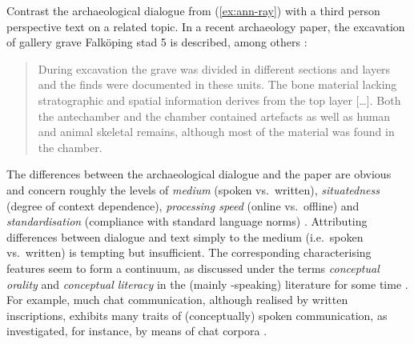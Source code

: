 \documentclass[output=paper
 	        ,biblatex
                ,babelshorthands
                ,newtxmath
                ,draftmode
                ,colorlinks, citecolor=brown
]{langscibook}
\begin{document}
\noindent
Contrast the archaeological dialogue from (\ref{ex:ann-ray}) with a third person perspective text on a related topic.
%
In a recent archaeology paper, the excavation of gallery grave Falköping stad 5 is described, among others \citep[]{Blank:Tornberg:Knipper:2018}:
%
\begin{quote}
During excavation the grave was divided in different sections and layers and the finds were documented in these units. The bone material lacking stratographic and spatial information derives from the top layer [\ldots]. Both the antechamber and the chamber contained artefacts as well as human and animal skeletal remains, although most of the material was found in the chamber.
\end{quote}

\noindent
The differences between the archaeological dialogue and the paper are obvious and concern roughly the levels of \emph{medium} (spoken vs.\ written), \emph{situatedness} (degree of context dependence), \emph{processing speed} (online vs.\ offline) and \emph{standardisation} (compliance with standard language norms) \citep{Klein:1985}.
%
Attributing differences between dialogue and text simply to the medium (i.e.\ spoken vs.\ written) is tempting but insufficient. 
%
The corresponding characterising features seem to form a continuum, as discussed under the terms \emph{conceptual orality} and \emph{conceptual literacy} in the (mainly -speaking) literature for some time \citep{Koch:Oesterreicher:1985}.
%
For example, much chat communication, although realised by written inscriptions, exhibits many traits of (conceptually) spoken communication, as investigated, for instance, by means of chat corpora \citep{Beisswenger:et:al:2012:a}. 
%
\end{document}
